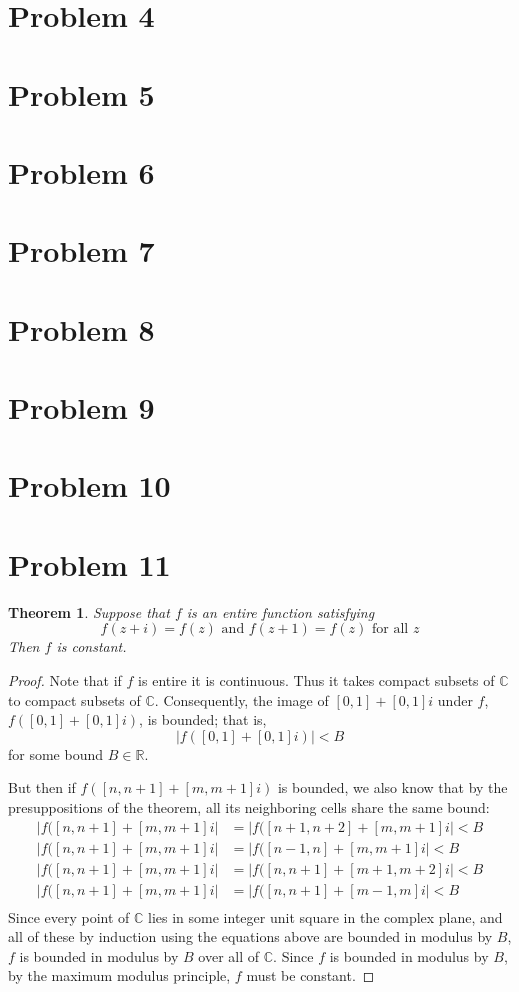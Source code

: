 \documentclass{article}
\newtheorem{theorem}[subsection]{Theorem}
\theoremstyle{definition}
\newcommand{\R}{\mathbb{R}}
\newcommand{\Co}{\mathbb{C}}
\newcommand{\abs}[1]{\left|#1\right|}
\begin{document}
\section{Problem 4}
\section{Problem 5}
\section{Problem 6}
\section{Problem 7}
\section{Problem 8}
\section{Problem 9}
\section{Problem 10}
\section{Problem 11}
\begin{theorem}
Suppose that $f$ is an entire function satisfying 
\[
f(z+i)=f(z) \text{ and } f(z+1)=f(z) \text{ for all } z
\]
Then $f$ is constant.
\end{theorem}
\begin{proof}
Note that if $f$ is entire it is continuous. Thus it takes compact subsets of $\Co$ to
compact subsets of $\Co$. Consequently, 
the image of $[0,1]+[0,1]i$ under $f$, $f([0,1] + [0,1]i)$, is bounded; that is,
\[
\abs{f([0,1]+[0,1]i)} < B
\]
for some bound $B \in \R$.

But then if $f([n,n+1] + [m,m+1]i)$ is bounded, we also know that by the presuppositions
of the theorem, all its neighboring cells share the same bound:
\begin{align*}
\abs{f([n,n+1]+[m,m+1]i}&=\abs{f([n+1,n+2]+[m,m+1]i} < B \\
\abs{f([n,n+1]+[m,m+1]i}&=\abs{f([n-1,n]+[m,m+1]i} < B \\
\abs{f([n,n+1]+[m,m+1]i}&=\abs{f([n,n+1]+[m+1,m+2]i} < B \\
\abs{f([n,n+1]+[m,m+1]i}&=\abs{f([n,n+1]+[m-1,m]i} < B \\
\end{align*}
Since every point of $\Co$ lies in some integer unit square in the complex
plane, and all of these by induction using the equations above are bounded
in modulus by $B$, $f$ is bounded in modulus by $B$ over all of $\Co$.
Since $f$ is bounded
in modulus by $B$, by the maximum modulus principle, $f$ must be constant.
\end{proof}
\end{document}
